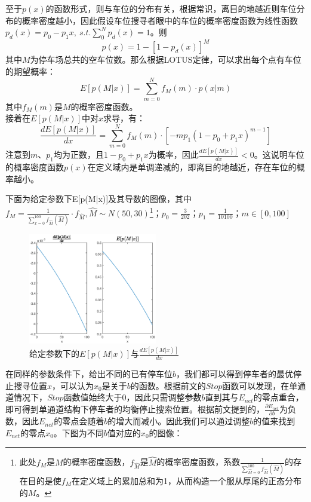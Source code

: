 \documentclass{thuemp}
\begin{document}
\par 至于$p(x)$的函数形式，则与车位的分布有关，根据常识，离目的地越近则车位分布的概率密度越小，因此假设车位搜寻者眼中的车位的概率密度函数为线性函数$p_d(x)=p_0-p_1x,~s.t. \sum_{0}^{N} p_d(x) = 1$。则
$$p(x)=1-\left[1-p_d(x)\right]^M$$
其中$M$为停车场总共的空车位数。那么根据LOTUS定律，可以求出每个点有车位的期望概率：$$E[p(M|x)]=\sum_{m=0}^{N}f_M(m)\cdot p(x|m)$$
其中$f_M(m)$是$M$的概率密度函数。\\
接着在$E[p(M|x)]$中对$x$求导，有：
$$\frac{d E[p(M|x)]}{d x} = \sum_{m=0}^{N}f_M(m)\cdot [-mp_1(1-p_0+p_1x)^{m-1}]$$
注意到$m$、$p_1$均为正数，且$1-p_0+p_1x$为概率，因此$\frac{d E[p(M|x)]}{d x}<0$。这说明车位的概率密度函数$p(x)$在定义域内是单调递减的，即离目的地越近，存在车位的概率越小。
\par 下面为给定参数下E[p(M|x)]及其导数的图像，其中$f_M = \frac{1}{\sum_{x=0}^{100}f_{\hat{M}}(\hat{M})} \cdot f_{\hat{M}}, \hat{M}\sim N(50,30)$\footnote{此处$f_M$是$M$的概率密度函数，$f_{\hat{M}}$是$\hat{M}$的概率密度函数，系数$\frac{1}{\sum_{\hat{M}=0}^{100}f_{\hat{M}}(\hat{M})}$的存在目的是使$f_M$在定义域上的累加总和为1，从而构造一个服从厚尾的正态分布的$M$。}；$p_0 = \frac{3}{202}$；$p_1 = \frac{1}{10100}$；$m\in[0,100]$

\begin{figure}[H]
    \centering
    \includegraphics[width=0.5\textwidth]{p_x & dp_x.eps}
    \caption{给定参数下的$E[p(M|x)]$与$\frac{d E[p(M|x)]}{d x}$}
\end{figure}

\par 在同样的参数条件下，给出不同的已有停车位$b$，我们都可以得到停车者的最优停止搜寻位置$x$，可以认为$x_0$是关于$b$的函数。根据前文的$Stop$函数可以发现，在单通道情况下，$Stop$函数值始终大于0，因此只需调整参数$b$直到其与$E_{net}$的零点重合，即可得到单通道结构下停车者的均衡停止搜索位置。根据前文提到的，$\frac{\partial E_{net}}{\partial b}$为负数，因此$E_{net}$的零点会随着$b$的增大而减小。因此我们可以通过调整$b$的值来找到$E_{net}$的零点$x_0$。下图为不同$b$值对应的$x_0$的图像：
\end{document}
